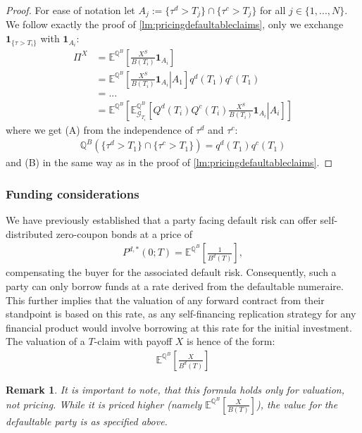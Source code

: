 \documentclass[12pt]{article}
\newtheorem{remark}[theorem]{Remark}
\begin{document}
	\begin{proof}
		For ease of notation let $A_j := \{\tau^d > T_j\} \cap\{\tau^c > T_j\}$ for all $j \in \{1, ..., N\}$.
		We follow exactly the proof of \cref{lm:pricingdefaultableclaims}, only we exchange $\mathbf{1}_{\{\tau > T_i\}}$ with $\mathbf{1}_{A_i}$:
		\begin{align*}
			\Pi^X &=  \mathbb{E}^{\mathbb{Q}^B}\left[\frac{X^S}{B(T_i)} \mathbf{1}_{A_i} \right]\\
		 	&=
		 	\mathbb{E}^{\mathbb{Q}^B}\left[\left.\frac{X^S}{B(T_i)} \mathbf{1}_{A_i} \right| A_1 \right]q^d(T_1)q^c(T_1)\tag{A}\\
		 	&=...\\
		 	&= \mathbb{E}^{\mathbb{Q}^B}\left[\mathbb{E}^{\mathbb{Q}^B}_{\mathcal{G}_{T_i}}\left[\left.Q^d(T_i)Q^c(T_i)\frac{X^S}{B(T_i)} \mathbf{1}_{A_i} \right| A_i \right]\right]\tag{B}
		\end{align*}
		where we get (A) from the independence of $\tau^d$ and $\tau^c$:
		\begin{align*}
		 	\mathbb{Q}^B\left(\{\tau^d > T_1\} \cap\{\tau^c > T_1\}\right) = q^d(T_1)q^c(T_1)
		\end{align*}
		and (B) in the same way as in the proof of \cref{lm:pricingdefaultableclaims}.
	\end{proof}
	
	\subsubsection{Funding considerations}
	We have previously established that a party facing default risk can offer self-distributed zero-coupon bonds at a price of
	\begin{align*}
		P^{d,*}(0;T) = \mathbb{E}^{\mathbb{Q}^B}\left[\frac{1}{B^d(T)}\right],
	\end{align*}
	compensating the buyer for the associated default risk. Consequently, such a party can only borrow funds at a rate derived from the defaultable numeraire. This further implies that the valuation of any forward contract from their standpoint is based on this rate, as any self-financing replication strategy for any financial product would involve borrowing at this rate for the initial investment. The valuation of a $T$-claim with payoff $X$ is hence of the form:
	\begin{align*}
		\mathbb{E}^{\mathbb{Q}^B}\left[\frac{X}{B^d(T)}\right]
	\end{align*}
	\begin{remark}
		It is important to note, that this formula holds only for valuation, not pricing. While it is priced higher (namely $\mathbb{E}^{\mathbb{Q}^B}\left[\frac{X}{B(T)}\right]$), the value for the defaultable party is as specified above.
	\end{remark}
	
\end{document}

